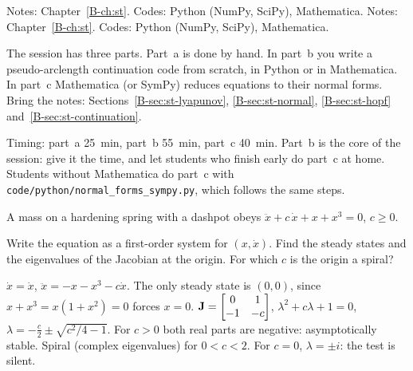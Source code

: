 \clearpage
\renewcommand{\sessionchapter}{Chapter 1 -- Differential equations and bifurcation}
\setcounter{spart}{0}
\setcounter{algorithm}{0}
\ifanswers
{}
  {Notes: Chapter~\ref{B-ch:st}. Codes: Python (NumPy, SciPy), Mathematica.}
\else
{}
  {Notes: Chapter~\ref{B-ch:st}. Codes: Python (NumPy, SciPy), Mathematica.}
\fi

\noindent
The session has three parts. Part~a is done by hand. In part~b you write a
pseudo-arclength continuation code from scratch, in Python or in Mathematica. In
part~c Mathematica (or SymPy) reduces equations to their normal forms. Bring the
notes: Sections~\ref{B-sec:st-lyapunov}, \ref{B-sec:st-normal}, \ref{B-sec:st-hopf}
and~\ref{B-sec:st-continuation}.

\begin{instructor}
Timing: part~a 25~min, part~b 55~min, part~c 40~min. Part~b is the core of the
session: give it the time, and let students who finish early do part~c at home.
Students without Mathematica do part~c with
\texttt{code/python/normal\_forms\_sympy.py}, which follows the same steps.
\end{instructor}

A mass on a hardening spring with a dashpot obeys
$\ddot x + c\,\dot x + x + x^3 = 0$, $c \ge 0$.

\q Write the equation as a first-order system for $(x,\dot x)$. Find the steady
states and the eigenvalues of the Jacobian at the origin. For which $c$ is the
origin a spiral?
\begin{answer}
$\dot x = \dot x$, $\ddot x = -x - x^3 - c\dot x$. The only steady state is
$(0,0)$, since $x + x^3 = x(1 + x^2) = 0$ forces $x = 0$.
$\mathbf{J} = \begin{bmatrix} 0 & 1\\ -1 & -c\end{bmatrix}$,
$\lambda^2 + c\lambda + 1 = 0$, $\lambda = -\tfrac c2 \pm \sqrt{c^2/4 - 1}$. For
$c > 0$ both real parts are negative: asymptotically stable. Spiral (complex
eigenvalues) for $0 < c < 2$. For $c = 0$, $\lambda = \pm i$: the test is silent.
\end{answer}

